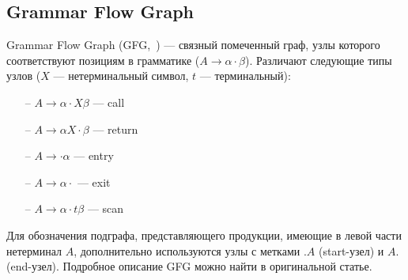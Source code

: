 


\subsection{Grammar Flow Graph}

Grammar Flow Graph (GFG,~\cite{gfg}) --- связный помеченный граф, узлы которого соответствуют позициям в грамматике ($A \rightarrow \alpha \cdot \beta$). Различают следующие типы узлов ($X$ --- нетерминальный символ, $t$ --- терминальный):
\begin{itemize}
    \setlength\itemsep{-0.2em}
    \item[--] $A \rightarrow \alpha \cdot X \beta   $ --- call
    \item[--] $A \rightarrow \alpha X \cdot \beta$ --- return
    \item[--] $A \rightarrow \cdot \alpha$ --- entry
    \item[--] $A \rightarrow \alpha \cdot$ --- exit
    \item[--] $A \rightarrow \alpha \cdot t \beta$ --- scan
\end{itemize}
Для обозначения подграфа, представляющего продукции, имеющие в левой части нетерминал $A$, дополнительно используются узлы с метками $.A$ (start-узел) и $A.$ (end-узел). Подробное описание GFG можно найти в оригинальной статье.

